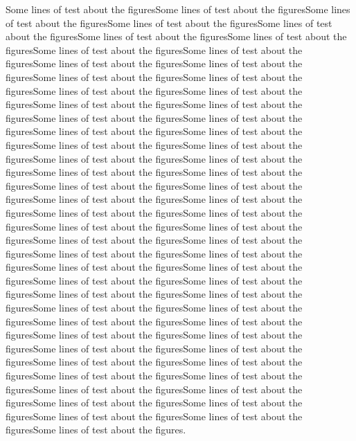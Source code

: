Some lines of test about the figuresSome lines of test about the figuresSome lines of test about the figuresSome lines of test about the figuresSome lines of test about the figuresSome lines of test about the figuresSome lines of test about the figuresSome lines of test about the figuresSome lines of test about the figuresSome lines of test about the figuresSome lines of test about the figuresSome lines of test about the figuresSome lines of test about the figuresSome lines of test about the figuresSome lines of test about the figuresSome lines of test about the figuresSome lines of test about the figuresSome lines of test about the figuresSome lines of test about the figuresSome lines of test about the figuresSome lines of test about the figuresSome lines of test about the figuresSome lines of test about the figuresSome lines of test about the figuresSome lines of test about the figuresSome lines of test about the figuresSome lines of test about the figuresSome lines of test about the figuresSome lines of test about the figuresSome lines of test about the figuresSome lines of test about the figuresSome lines of test about the figuresSome lines of test about the figuresSome lines of test about the figuresSome lines of test about the figuresSome lines of test about the figuresSome lines of test about the figuresSome lines of test about the figuresSome lines of test about the figuresSome lines of test about the figuresSome lines of test about the figuresSome lines of test about the figuresSome lines of test about the figuresSome lines of test about the figuresSome lines of test about the figuresSome lines of test about the figuresSome lines of test about the figuresSome lines of test about the figuresSome lines of test about the figuresSome lines of test about the figuresSome lines of test about the figuresSome lines of test about the figuresSome lines of test about the figuresSome lines of test about the figuresSome lines of test about the figuresSome lines of test about the figuresSome lines of test about the figuresSome lines of test about the figuresSome lines of test about the figuresSome lines of test about the figuresSome lines of test about the figuresSome lines of test about the figuresSome lines of test about the figuresSome lines of test about the figures.
